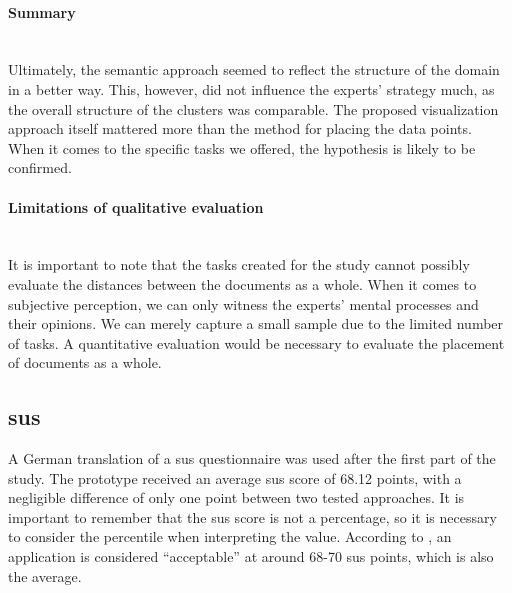 \paragraph{Summary}~\\
Ultimately, the semantic approach seemed to reflect the structure of the domain in a better way.
This, however, did not influence the experts' strategy much, as the overall structure of the clusters was comparable.
The proposed visualization approach itself mattered more than the method for placing the data points.
When it comes to the specific tasks we offered, the hypothesis is likely to be confirmed.

\paragraph{Limitations of qualitative evaluation}~\\
It is important to note that the tasks created for the study cannot possibly evaluate the distances between the documents as a whole.
When it comes to subjective perception, we can only witness the experts' mental processes and their opinions.
We can merely capture a small sample due to the limited number of tasks.
A quantitative evaluation would be necessary to evaluate the placement of documents as a whole.

\subsection{\gls{sus}}
\label{subsec:sus}

A German translation \cite{Rauer2011} of a \gls{sus} questionnaire was used after the first part of the study. The prototype received an average \gls{sus} score of 68.12 points, with a negligible difference of only one point between two tested approaches. It is important to remember that the \gls{sus} score is not a percentage, so it is necessary to consider the percentile when interpreting the value. According to \cite{Bangor2009}, an application is considered ``acceptable'' at around 68-70 \gls{sus} points, which is also the average.

